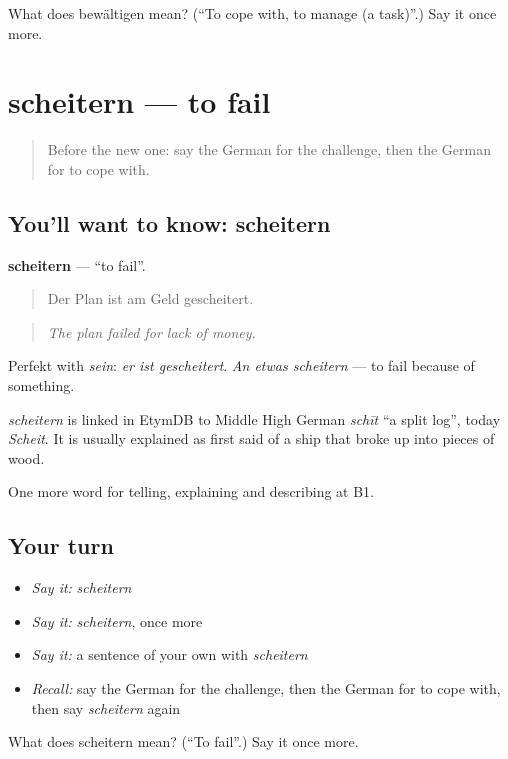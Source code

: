 \begin{tcolorbox}[breakable,colback=teal!4,colframe=teal!35!black,title={Before you move on}]
What does bewältigen mean? (\textquotedblleft{}To cope with, to manage (a task)\textquotedblright{}.) Say it once more.
\end{tcolorbox}
\section[scheitern]{scheitern — to fail}

\label{lesson:GE-C356-scheitern}



\begin{quote}
Before the new one: say the German for the challenge, then the German for to cope with.
\end{quote}

\subsection*{You'll want to know: scheitern}
\textbf{scheitern} — \textquotedblleft{}to fail\textquotedblright{}.

\begin{quote}
Der Plan ist am Geld gescheitert.
\end{quote}

\begin{quote}
\emph{The plan failed for lack of money.}
\end{quote}

Perfekt with \emph{sein}: \emph{er ist gescheitert}. \emph{An etwas scheitern} — to fail because of something.

\begin{cousinweb}
\emph{scheitern} is linked in EtymDB to Middle High German \emph{schīt} \textquotedblleft{}a split log\textquotedblright{}, today \emph{Scheit}. It is usually explained as first said of a ship that broke up into pieces of wood.
\end{cousinweb}

\begin{grammarlens}[title={What you've built}]
One more word for telling, explaining and describing at B1.
\end{grammarlens}

\subsection*{Your turn}
\begin{itemize}
\raggedright
  \item \emph{Say it:} \emph{scheitern}
  \item \emph{Say it:} \emph{scheitern}, once more
  \item \emph{Say it:} a sentence of your own with \emph{scheitern}
  \item \emph{Recall:} say the German for the challenge, then the German for to cope with, then say \emph{scheitern} again
\end{itemize}

\begin{tcolorbox}[breakable,colback=teal!4,colframe=teal!35!black,title={Before you move on}]
What does scheitern mean? (\textquotedblleft{}To fail\textquotedblright{}.) Say it once more.
\end{tcolorbox}
